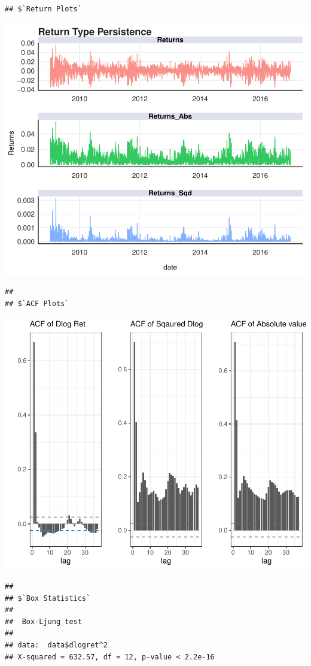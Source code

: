\documentclass[11pt,preprint, authoryear]{elsarticle}
\numberwithin{equation}{section}
\numberwithin{figure}{section}
\numberwithin{table}{section}
\begin{document}
\begin{verbatim}
## $`Return Plots`
\end{verbatim}

\includegraphics{Essay_files/figure-latex/garch-1.pdf}

\begin{verbatim}
## 
## $`ACF Plots`
\end{verbatim}

\includegraphics{Essay_files/figure-latex/garch-2.pdf}

\begin{verbatim}
## 
## $`Box Statistics`
## 
##  Box-Ljung test
## 
## data:  data$dlogret^2
## X-squared = 632.57, df = 12, p-value < 2.2e-16
\end{verbatim}
\end{document}
